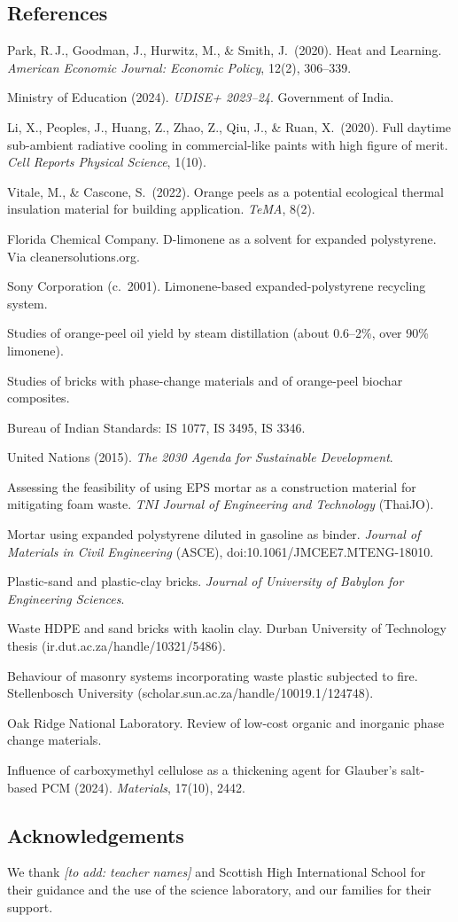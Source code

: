 \documentclass[11pt,a4paper]{article}
\newcommand{\toadd}[1]{\textit{\color{soft}[to add: #1]}}
\begin{document}
\subsection*{References}
\sloppy
\small
\begin{enumerate}[label={[\arabic*]},leftmargin=*]
\item Park, R.\,J., Goodman, J., Hurwitz, M., \& Smith, J.\ (2020). Heat and Learning. \emph{American Economic Journal: Economic Policy}, 12(2), 306--339.
\item Ministry of Education (2024). \emph{UDISE+ 2023--24}. Government of India.
\item Li, X., Peoples, J., Huang, Z., Zhao, Z., Qiu, J., \& Ruan, X.\ (2020). Full daytime sub-ambient radiative cooling in commercial-like paints with high figure of merit. \emph{Cell Reports Physical Science}, 1(10).
\item Vitale, M., \& Cascone, S.\ (2022). Orange peels as a potential ecological thermal insulation material for building application. \emph{TeMA}, 8(2).
\item Florida Chemical Company. D-limonene as a solvent for expanded polystyrene. Via cleanersolutions.org.
\item Sony Corporation (c.\ 2001). Limonene-based expanded-polystyrene recycling system.
\item Studies of orange-peel oil yield by steam distillation (about 0.6--2\%, over 90\% limonene).
\item Studies of bricks with phase-change materials and of orange-peel biochar composites.
\item Bureau of Indian Standards: IS 1077, IS 3495, IS 3346.
\item United Nations (2015). \emph{The 2030 Agenda for Sustainable Development}.
\item Assessing the feasibility of using EPS mortar as a construction material for mitigating foam waste. \emph{TNI Journal of Engineering and Technology} (ThaiJO).
\item Mortar using expanded polystyrene diluted in gasoline as binder. \emph{Journal of Materials in Civil Engineering} (ASCE), doi:10.1061/JMCEE7.MTENG-18010.
\item Plastic-sand and plastic-clay bricks. \emph{Journal of University of Babylon for Engineering Sciences}.
\item Waste HDPE and sand bricks with kaolin clay. Durban University of Technology thesis (ir.dut.ac.za/handle/10321/5486).
\item Behaviour of masonry systems incorporating waste plastic subjected to fire. Stellenbosch University (scholar.sun.ac.za/handle/10019.1/124748).
\item Oak Ridge National Laboratory. Review of low-cost organic and inorganic phase change materials.
\item Influence of carboxymethyl cellulose as a thickening agent for Glauber's salt-based PCM (2024). \emph{Materials}, 17(10), 2442.
\end{enumerate}

\normalsize
\subsection*{Acknowledgements}
We thank \toadd{teacher names} and Scottish High International School for
their guidance and the use of the science laboratory, and our families for
their support.
\end{document}
